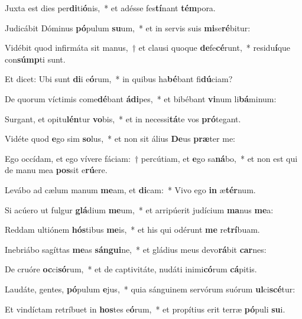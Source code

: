\item Juxta est dies per\textbf{di}ti\textbf{ó}nis,~* et adésse fes\textbf{tí}nant \textbf{tém}pora.
\item Judicábit Dóminus \textbf{pó}pulum \textbf{su}um,~* et in servis suis \textbf{mi}se\textbf{ré}bitur:
\item Vidébit quod infirmáta sit manus,~† et clausi quoque \textbf{de}fe\textbf{cé}runt,~* residu\textbf{í}que con\textbf{súmp}ti sunt.
\item Et dicet: Ubi sunt \textbf{di}i e\textbf{ó}rum,~* in quibus ha\textbf{bé}bant fi\textbf{dú}ciam?
\item De quorum víctimis come\textbf{dé}bant \textbf{á}\textbf{di}pes,~* et bibébant \textbf{vi}num li\textbf{bá}minum:
\item Surgant, et opitu\textbf{lén}tur \textbf{vo}bis,~* et in necessi\textbf{tá}te vos \textbf{pró}tegant.
\item Vidéte quod \textbf{e}go sim \textbf{so}lus,~* et non sit álius \textbf{De}us \textbf{præ}ter me:
\item Ego occídam, et ego vívere fáciam:~† percútiam, et \textbf{e}go sa\textbf{ná}bo,~* et non est qui de manu mea \textbf{pos}sit e\textbf{rú}ere.
\item Levábo ad cælum manum \textbf{me}am, et \textbf{di}cam:~* Vivo ego \textbf{in} æ\textbf{tér}num.
\item Si acúero ut fulgur \textbf{glá}dium \textbf{me}um,~* et arripúerit judícium \textbf{ma}nus \textbf{me}a:
\item Reddam ultiónem \textbf{hós}tibus \textbf{me}is,~* et his qui odérunt \textbf{me} re\textbf{trí}buam.
\item Inebriábo sagíttas \textbf{me}as \textbf{sán}\textbf{gui}ne,~* et gládius meus devo\textbf{rá}bit \textbf{car}nes:
\item De cruóre \textbf{oc}ci\textbf{só}rum,~* et de captivitáte, nudáti inimi\textbf{có}rum \textbf{cá}pitis.
\item Laudáte, gentes, \textbf{pó}pulum \textbf{e}jus,~* quia sánguinem servórum suórum \textbf{ul}ci\textbf{scé}tur:
\item Et vindíctam retríbuet in \textbf{hos}tes e\textbf{ó}rum,~* et propítius erit terræ \textbf{pó}puli \textbf{su}i.
